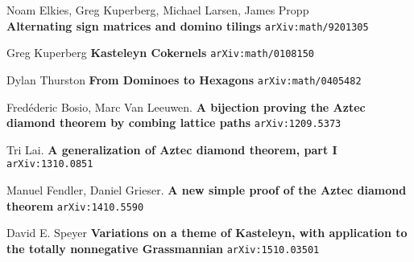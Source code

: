 \documentclass[12pt]{article}
\begin{document}
\selectfont \fontsize{12}{10}\selectfont

\begin{thebibliography}{}

\item Noam Elkies, Greg Kuperberg, Michael Larsen, James Propp  \\ \textbf{Alternating sign matrices and domino tilings} \texttt{arXiv:math/9201305}

\item Greg Kuperberg \textbf{Kasteleyn Cokernels} \texttt{arXiv:math/0108150}

\item Dylan Thurston \textbf{From Dominoes to Hexagons} \texttt{arXiv:math/0405482}

\item Fred\'{e}deric Bosio, Marc Van Leeuwen. \textbf{A bijection proving the Aztec diamond theorem by combing lattice paths} \texttt{arXiv:1209.5373}

\item Tri Lai. \textbf{A generalization of Aztec diamond theorem, part I} \texttt{arXiv:1310.0851}

\item Manuel Fendler, Daniel Grieser. \textbf{A new simple proof of the Aztec diamond theorem} \texttt{arXiv:1410.5590}

\item David E. Speyer \textbf{Variations on a theme of Kasteleyn, with application to the totally nonnegative Grassmannian} \texttt{arXiv:1510.03501}

\end{thebibliography}

\newpage

\selectfont \fontsize{20}{25}\selectfont
\end{document}
